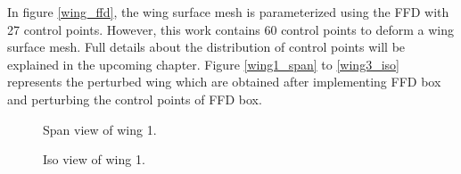 In figure \ref{wing_ffd}, the wing surface mesh is parameterized using the FFD with 27 control points. However, this work contains 60 control points to deform a wing surface mesh. Full details about the distribution of control points will be explained in the upcoming chapter. Figure \ref{wing1_span} to \ref{wing3_iso} represents the perturbed wing which are obtained after implementing FFD box and perturbing the control points of FFD box.

\begin{figure}[!ht]
    \parbox{0.47\linewidth}
    {
    \centering
    \caption{Span view of wing 1.}
    \label{wing1_span}
    }
    \parbox{0.47\linewidth}
    {
    \centering
    \caption{Iso view of wing 1.}
    \label{wing1_iso}
    }
\end{figure}


